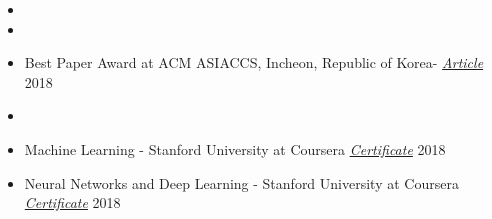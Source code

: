 
\begin{itemize}[noitemsep,topsep=0pt]
	\item {}
	\item {}
	\item Best Paper Award at ACM ASIACCS, Incheon, Republic of Korea- \href{https://www.bu.edu/eng/2018/08/14/best-paper-award-asia-conference-on-computer-and-communication-security-2018/}{ \textit{Article}} 2018
	\item {}
	\item Machine Learning - Stanford University at Coursera  \href{https://www.coursera.org/account/accomplishments/verify/U5YHWN3XSAQU}{\textit{Certificate}} 2018
	\item Neural Networks and Deep Learning - Stanford University at Coursera \href{https://www.coursera.org/account/accomplishments/verify/ZU26W977NR9P}{\textit{Certificate}} 2018\\
\end{itemize}